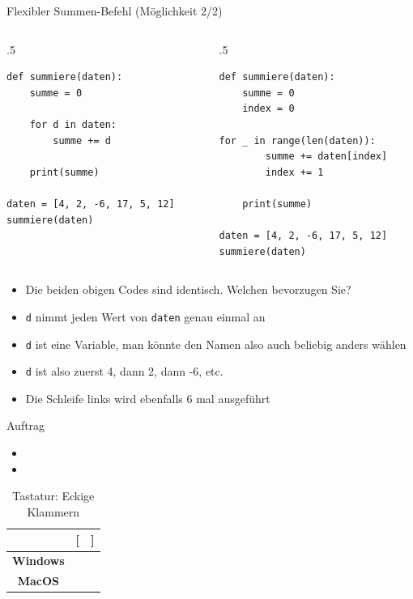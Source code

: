 \begin{frame}[fragile]{Flexibler Summen-Befehl (Möglichkeit 2/2)}
	\begin{columns}
	\begin{column}{.5\textwidth}
	\begin{lstlisting}[basicstyle=\ttfamily\footnotesize]
def summiere(daten):
	summe = 0

	for d in daten:
		summe += d

	print(summe)

daten = [4, 2, -6, 17, 5, 12] 
summiere(daten)
		\end{lstlisting}
	\end{column}
	\begin{column}{.5\textwidth}
	\begin{lstlisting}[basicstyle=\ttfamily\footnotesize]
def summiere(daten):
	summe = 0
	index = 0
	
for _ in range(len(daten)):
		summe += daten[index]
		index += 1

	print(summe)

daten = [4, 2, -6, 17, 5, 12] 
summiere(daten)
		\end{lstlisting}
	\end{column}
	\end{columns}
\begin{itemize}[<+->]
	\item Die beiden obigen Codes sind identisch. Welchen bevorzugen Sie?
	\item \lstinline|d| nimmt jeden Wert von \lstinline|daten| genau einmal an
	\item \lstinline|d| ist eine Variable, man könnte den Namen also auch beliebig anders wählen
	\item \lstinline|d| ist also zuerst 4, dann 2, dann -6, etc.
	\item Die Schleife links wird ebenfalls 6 mal ausgeführt
\end{itemize}
\end{frame}


\begin{frame}[fragile]{Auftrag}
	\begin{itemize}
		\item {}
		\item {}
	\end{itemize}
	\begin{table}[H]
		\centering
		\begin{tabular}{c||c|c}
			                 & [               & ]               \\\midrule\midrule
			\textbf{Windows} & \keys{\AltGr+ü} & \keys{\AltGr+!} \\\midrule
			\textbf{MacOS}   & \keys{\Alt+5}   & \keys{\Alt+6}   \\
		\end{tabular}
		\caption*{Tastatur: Eckige Klammern}
	\end{table}
\end{frame}

